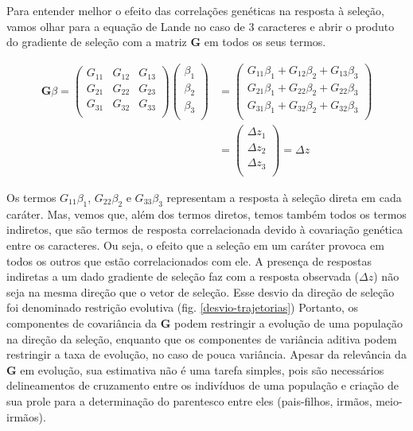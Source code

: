 \documentclass[portuges,]{tufte-handout}
\begin{document}
Para entender melhor o efeito das correlações genéticas na resposta à
seleção, vamos olhar para a equação de Lande no caso de 3 caracteres e
abrir o produto do gradiente de seleção com a matriz \(\mathbf{G}\) em
todos os seus termos.

\begin{align}
\mathbf{G}\beta  =
\left (
\begin{matrix}
G_{11} & G_{12} & G_{13}\\
G_{21} & G_{22} & G_{23} \\
G_{31} & G_{32} & G_{33}\\
\end{matrix}
\right )
\left (
\begin{matrix}
\beta_{1}  \\
\beta_{2}   \\
\beta_{3}  \\
\end{matrix}
\right )
&=
\left (
\begin{matrix}
G_{11}\beta_{1} +  G_{12}\beta_{2} +  G_{13}\beta_{3}\\
G_{21}\beta_{1} +  G_{22}\beta_{2} +  G_{22}\beta_{3}\\
G_{31}\beta_{1} +  G_{32}\beta_{2} +  G_{32}\beta_{3}\\
\end{matrix}
\right )
\\
&=
\left (
\begin{matrix}
\Delta z_{1}  \\
\Delta z_{2}   \\
\Delta z_{3}  \\
\end{matrix}
\right )
=
\Delta z
\end{align}

Os termos \(G_{11}\beta_{1}\), \(G_{22}\beta_{2}\) e \(G_{33}\beta_{3}\)
representam a resposta à seleção direta em cada caráter. Mas, vemos que,
além dos termos diretos, temos também todos os termos indiretos, que são
termos de resposta correlacionada devido à covariação genética entre os
caracteres. Ou seja, o efeito que a seleção em um caráter provoca em
todos os outros que estão correlacionados com ele. A presença de
respostas indiretas a um dado gradiente de seleção faz com a resposta
observada (\(\Delta z\)) não seja na mesma direção que o vetor de
seleção. Esse desvio da direção de seleção foi denominado restrição
evolutiva (fig. \ref{desvio-trajetorias}) Portanto, os componentes de
covariância da \(\mathbf{G}\) podem restringir a evolução de uma
população na direção da seleção, enquanto que os componentes de
variância aditiva podem restringir a taxa de evolução, no caso de pouca
variância. Apesar da relevância da \(\mathbf{G}\) em evolução, sua
estimativa não é uma tarefa simples, pois são necessários delineamentos
de cruzamento entre os indivíduos de uma população e criação de sua
prole para a determinação do parentesco entre eles (pais-filhos, irmãos,
meio-irmãos).
\end{document}

